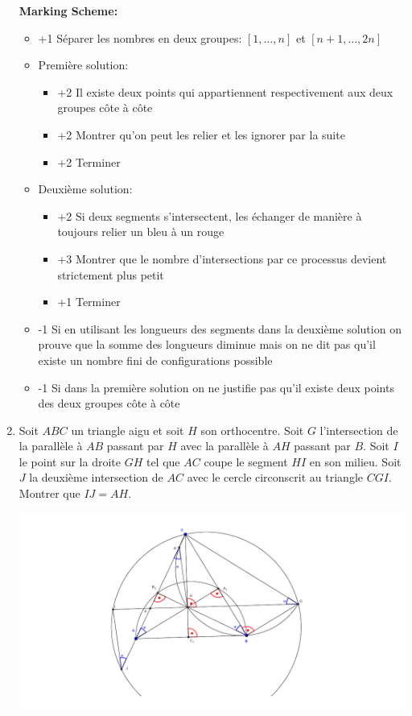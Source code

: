 \documentclass[language=german,style=solution]{smo}
\begin{document}
\begin{enumerate}[label=\textbf{\arabic*.}]
\textbf{Marking Scheme:}
\begin{itemize}
\item +1 Séparer les nombres en deux groupes: $[1, \dots, n]$ et $[n+1, \dots, 2n]$\\
\item Première solution:
\begin{itemize}[$\triangle$]
\item +2 Il existe deux points qui appartiennent respectivement aux deux groupes côte à côte
\item +2 Montrer qu'on peut les relier et les ignorer par la suite
\item +2 Terminer
\end{itemize}
\item Deuxième solution:
\begin{itemize}[$\triangle$]
\item +2 Si deux segments s'intersectent, les échanger de manière à toujours relier un bleu à un rouge
\item +3 Montrer que le nombre d'intersections par ce processus devient strictement plus petit
\item +1 Terminer
\end{itemize}
\item -1 Si en utilisant les longueurs des segments dans la deuxième solution on prouve que la somme des longueurs diminue mais on ne dit pas qu'il existe un nombre fini de configurations possible
\item -1 Si dans la première solution on ne justifie pas qu'il existe deux points des deux groupes côte à côte
\end{itemize}

\newpage

\item Soit $ABC$ un triangle aigu et soit $H$ son orthocentre. Soit $G$ l'intersection de la parallèle à $AB$ passant par $H$ avec la parallèle à $AH$ passant par $B$. Soit $I$ le point sur la droite $GH$ tel que $AC$ coupe le segment $HI$ en son milieu. Soit $J$ la deuxième intersection de $AC$ avec le cercle circonscrit au triangle $CGI$. Montrer que $IJ=AH$.

\includegraphics{finalrunde_8_2016.pdf}


\end{enumerate}
\end{document}
